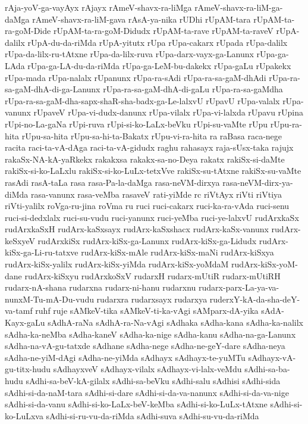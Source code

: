 {rAja-yoV-ga-vayAyx
rAjayx
rAmeV-shavx-ra-liMga
rAmeV-shavx-ra-liM-ga-daMga
rAmeV-shavx-ra-liM-gava
rAsA-ya-nika
rUDhi
rUpAM-tara
rUpAM-ta-ra-goM-Dide
rUpAM-ta-ra-goM-Didudx
rUpAM-ta-rave
rUpAM-ta-raveV
rUpA-dalilx
rUpA-du-da-riMda
rUpA-yitutx
rUpa
rUpa-cakarx
rUpada
rUpa-dalilx
rUpa-da-lilx-ru-tAtxne
rUpa-da-lilx-ruva
rUpa-darx-vayx-ga-Lanunx
rUpa-ga-LAda
rUpa-ga-LA-du-da-riMda
rUpa-ga-LeM-bu-dakekx
rUpa-gaLu
rUpakekx
rUpa-mada
rUpa-nalalx
rUpanunx
rUpa-ra-sAdi
rUpa-ra-sa-gaM-dhAdi
rUpa-ra-sa-gaM-dhA-di-ga-Lanunx
rUpa-ra-sa-gaM-dhA-di-gaLu
rUpa-ra-sa-gaMdha
rUpa-ra-sa-gaM-dha-sapx-shaR-sha-badx-ga-Le-lalxvU
rUpavU
rUpa-valalx
rUpa-vanunx
rUpaveV
rUpa-vi-dudx-danunx
rUpa-vilalx
rUpa-vi-lalxda
rUpavu
rUpina
rUpi-no-La-gaNa
rUpi-ruva
rUpi-si-ko-LaLx-beVku
rUpi-su-vaMte
rUpu
rUpu-ra-hita
rUpu-sa-hita
rUpu-sa-hi-ta-Bakatx
rUpu-vi-ra-hita
ra
raBasa
raca-nege
racita
raci-ta-vA-dAga
raci-ta-vA-gidudx
raghu
rahasayx
raja-sUsx-taka
rajujx
rakaSx-NA-kA-yaRkekx
rakakxsa
rakakx-sa-no-Deya
rakatx
rakiSx-si-daMte
rakiSx-si-ko-LaLxlu
rakiSx-si-ko-LuLx-tetxVve
rakiSx-su-tAtxne
rakiSx-su-vaMte
rasAdi
rasA-taLa
rasa
rasa-Pa-la-daMga
rasa-neVM-dirxya
rasa-neVM-dirx-ya-diMda
rasa-vanunx
rasa-veMba
rasaveV
rati-yiMde
rc
riVtAyx
riVti
riVtiya
riVti-yalilx
roVga-ru-jina
roVma
ru
ruci
ruci-cakarx
ruci-ka-ra-vAda
ruci-senu
ruci-si-dedxlalx
ruci-su-vudu
ruci-yanunx
ruci-yeMba
ruci-ye-lalxvU
rudArxkaSx
rudArxkaSxH
rudArx-kaSxsayx
rudArx-kaSxshacx
rudArx-kaSx-vanunx
rudArx-keSxyeV
rudArxkiSx
rudArx-kiSx-ga-Lanunx
rudArx-kiSx-ga-Lidudx
rudArx-kiSx-ga-Li-ru-tatxve
rudArx-kiSx-mAle
rudArx-kiSx-maNi
rudArx-kiSxya
rudArx-kiSx-yalilx
rudArx-kiSx-yiMda
rudArx-kiSx-yoMdaM
rudArx-kiSx-yoM-dane
rudArx-kiSxyu
rudArxkoSxV
rudarxH
rudarx-mUtiR
rudarx-mUtiRH
rudarx-nA-shana
rudarxna
rudarx-ni-hanu
rudarxnu
rudarx-parx-La-ya-va-nunxM-Tu-mA-Du-vudu
rudarxra
rudarxsayx
rudarxya
ruderxY-kA-da-sha-deY-va-tamf
ruhf
ruje
sAMkeV-tika
sAMkeV-ti-ka-vAgi
sAMparx-dA-yika
sAdA-Kayx-gaLu
sAdhA-raNa
sAdhA-ra-Na-vAgi
sAdhaka
sAdha-kana
sAdha-ka-nalilx
sAdha-ka-neMba
sAdha-kaneV
sAdha-ka-nige
sAdha-kanu
sAdha-na-ga-Lanunx
sAdha-na-vA-gu-tatxde
sAdhane
sAdha-nege
sAdha-ne-geY-dare
sAdha-neya
sAdha-ne-yiM-dAgi
sAdha-ne-yiMda
sAdhayx
sAdhayx-te-yuMTu
sAdhayx-vA-gu-titx-hudu
sAdhayxveV
sAdhayx-vilalx
sAdhayx-vi-lalx-veMdu
sAdhi-sa-ba-hudu
sAdhi-sa-beV-kA-gilalx
sAdhi-sa-beVku
sAdhi-salu
sAdhisi
sAdhi-sida
sAdhi-si-da-naM-tara
sAdhi-si-dare
sAdhi-si-da-va-nanunx
sAdhi-si-da-va-nige
sAdhi-si-da-vanu
sAdhi-si-ko-LaLx-beV-keMba
sAdhi-si-ko-LuLx-tAtxne
sAdhi-si-ko-LuLxva
sAdhi-si-ru-vu-da-riMda
sAdhi-suva
sAdhi-su-vu-da-riMda
}
